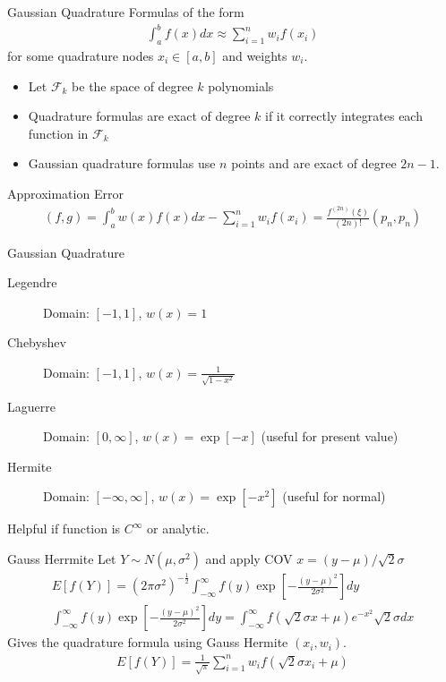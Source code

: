 \documentclass[xcolor=pdftex,dvipsnames,table,mathserif,aspectratio=169]{beamer}
\begin{document}
\begin{frame}{Gaussian Quadrature}
Formulas of the form
\begin{eqnarray*}
\int_{a}^b f(x) d x \approx \sum_{i=1}^n  w_i f(x_i)
\end{eqnarray*}
for some quadrature nodes $x_i \in [a,b]$ and weights $w_i$.
\begin{itemize}
\item Let $\mathcal{F}_k$ be the space of degree $k$ polynomials
\item Quadrature formulas are exact of degree $k$ if it correctly integrates each function in $\mathcal{F}_k$
\item Gaussian quadrature formulas use $n$ points and are exact of degree $2n-1$.
\end{itemize}
Approximation Error
\begin{eqnarray*}
(f,g) = \int_a^b w(x) f(x)  dx - \sum_{i=1}^n w_i f(x_i) = \frac{f^{(2n)}(\xi)}{(2n)!} (p_n,p_n) 
\end{eqnarray*}
\end{frame}

\begin{frame}{Gaussian Quadrature}
\begin{description}
\item[Legendre] Domain: $[-1,1]$, $w(x) = 1$
\item[Chebyshev] Domain: $[-1,1]$, $w(x) = \frac{1}{\sqrt{1-x^2}}$
\item[Laguerre] Domain: $[0,\infty]$, $w(x) = \exp[-x]$ (useful for present value)
\item[Hermite] Domain: $[-\infty,\infty]$, $w(x) = \exp[-x^2]$ (useful for normal)
\end{description}
Helpful if function is $C^{\infty}$ or analytic.
\end{frame}

\begin{frame}{Gauss Herrmite}
Let $Y\sim N(\mu,\sigma^2)$ and apply COV $x = (y-\mu)/\sqrt{2} \sigma$
\begin{eqnarray*}
E[f(Y)] = (2 \pi \sigma^2)^{-\frac{1}{2}} \int_{-\infty}^{\infty} f(y) \exp\left[-\frac{(y-\mu)^2}{2\sigma^2} \right] dy \\
\int_{-\infty}^{\infty} f(y) \exp\left[-\frac{(y-\mu)^2}{2\sigma^2} \right] dy = \int_{-\infty}^{\infty} f(\sqrt{2} \sigma x + \mu) e^{-x^2} \sqrt{2} \sigma dx
\end{eqnarray*}
Gives the quadrature formula using Gauss Hermite $(x_i,w_i)$.
\begin{eqnarray*}
E[f(Y)] = \frac{1}{\sqrt{\pi}} \sum_{i=1}^n w_i f(\sqrt{2}\sigma x_i + \mu)
\end{eqnarray*}
\end{frame}
\end{document}
